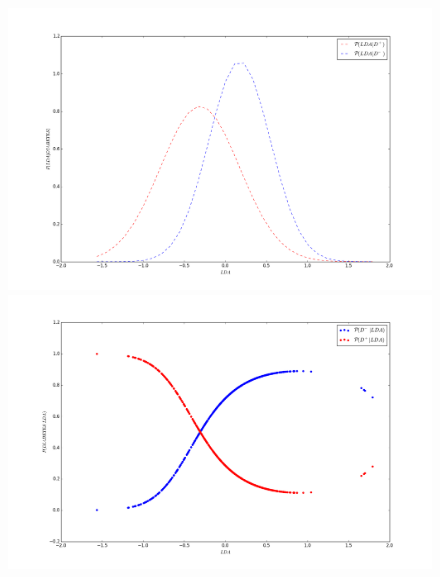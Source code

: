 \documentclass[letter, titlepage, 10pt]{article}
\begin{document}
\begin{appendices}
  \begin{figure}[H]
  \centering
    \begin{minipage}{.5\textwidth}
        \centering
        \includegraphics[width=1\linewidth]{images/PDF_D4}
    \end{minipage}%
    \begin{minipage}{.5\textwidth}
        \centering
        \includegraphics[width=1\linewidth]{images/CP_D4}
    \end{minipage}
\end{figure}


\end{appendices}
\end{document}
